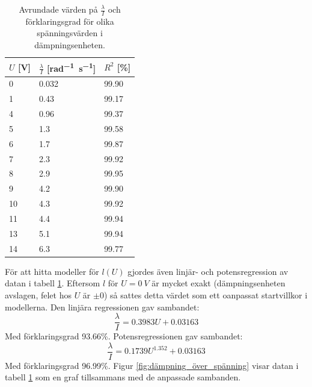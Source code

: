 \documentclass[12pt, a4paper]{article}
\begin{document}
\begin{table}[hp]
	\centering
	\caption{Avrundade värden på $\frac{\lambda}{I}$ och förklaringsgrad för olika spänningsvärden i dämpningsenheten.}
	\begin{tabular}{ |l|l|l| }
		\hline 
		\rule{0ex}{1.5em}
		$U$ [V] & $\frac{\lambda}{I}$ [\si{rad^{-1}s^{-1}}] & $R^2$ [\%]
		\\[0.5em]
		\hline
		0 & 0.032 & 99.90 \\
		\hline
		1 & 0.43 & 99.17 \\
		\hline
		4 & 0.96 & 99.37 \\
		\hline
		5 & 1.3 & 99.58 \\
		\hline
		6 & 1.7 & 99.87 \\
		\hline
		7 & 2.3 & 99.92 \\
		\hline
		8 & 2.9 & 99.95 \\
		\hline
		9 & 4.2 & 99.90 \\
		\hline
		10 & 4.3 & 99.92 \\
		\hline
		11 & 4.4 & 99.94 \\
		\hline
		13 & 5.1 & 99.94 \\
		\hline
		14 & 6.3 & 99.77 \\
		\hline
	\end{tabular}
	\label{tb:dämpning_spänning}
\end{table}

För att hitta modeller för $l(U)$ gjordes även linjär- och potensregression av datan i tabell \ref{tb:dämpning_spänning}. Eftersom $l$ för $U=\SI{0}{V}$ är mycket exakt (dämpningsenheten avslagen, felet hos $U$ är $\pm0$) så sattes detta värdet som ett oanpassat startvillkor i modellerna. Den linjära regressionen gav sambandet:
\begin{equation}\label{eq:linjärt_samband_dämpning}
	\frac{\lambda}{I}=0.3983U+0.03163
\end{equation}
Med förklaringsgrad 93.66\%.
Potensregressionen gav sambandet:
\begin{equation}\label{eq:potenssamband_dämpning}
	\frac{\lambda}{I}=0.1739U^{1.352}+0.03163
\end{equation}
Med förklaringsgrad 96.99\%.
Figur \ref{fig:dämpning_över_spänning} visar datan i tabell \ref{tb:dämpning_spänning} som en graf tillsammans med de anpassade sambanden.
\end{document}
